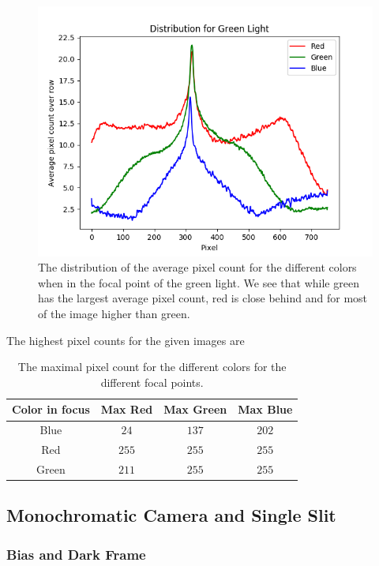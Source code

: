 \documentclass{emulateapj}
\begin{document}
\begin{figure}[H]
\centering
\includegraphics[scale=0.3]{greenDist.png}
\caption{The distribution of the average pixel count for the different colors when in the focal point of the green light. We see that while green has the largest average pixel count, red is close behind and for most of the image higher than green.}
\label{img:greenDist}
\end{figure}

The highest pixel counts for the given images are

\begin{table}[H]
\centering
\begin{tabular}{c | c | c | c}
Color in focus & Max Red & Max Green &Max Blue \\
\hline
Blue & $24$ & $137$ & $202$\\
Red & $255$ & $255$ & $255$\\
Green & $211$ & $255$ & $255$
\end{tabular}
\caption{The maximal pixel count for the different colors for the different focal points.}
\label{tab:colorMaxMin}
\end{table}




\subsection{Monochromatic Camera and Single Slit}
\label{sec:redMono}

\subsubsection{Bias and Dark Frame}
\label{sec:biasDark}
\end{document}
